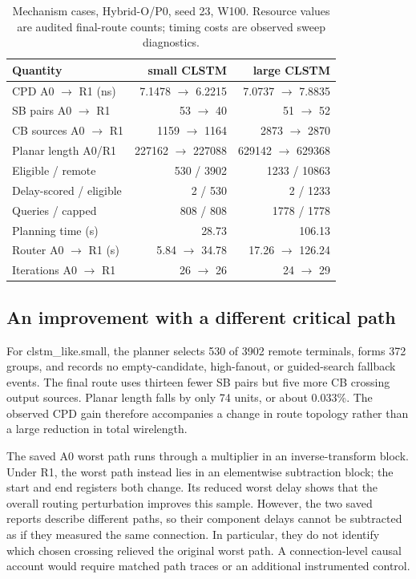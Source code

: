 \documentclass[conference,10pt]{IEEEtran}
\begin{document}
\begin{table}[h]
\centering\caption{Mechanism cases, Hybrid-O/P0, seed 23, W100. Resource values are audited final-route counts; timing costs are observed sweep diagnostics.}
\label{tab:mechanism}
\small\setlength{\tabcolsep}{3pt}
\begin{tabular}{lrr}\hline
Quantity&small CLSTM&large CLSTM\\\hline
CPD A0 $\rightarrow$ R1 (ns)&7.1478 $\to$ 6.2215&7.0737 $\to$ 7.8835\\
SB pairs A0 $\rightarrow$ R1&53 $\rightarrow$ 40&51 $\rightarrow$ 52\\
CB sources A0 $\rightarrow$ R1&1159 $\rightarrow$ 1164&2873 $\rightarrow$ 2870\\
Planar length A0/R1&227162 $\rightarrow$ 227088&629142 $\rightarrow$ 629368\\
Eligible / remote&530 / 3902&1233 / 10863\\
Delay-scored / eligible&2 / 530&2 / 1233\\
Queries / capped&808 / 808&1778 / 1778\\
Planning time (s)&28.73&106.13\\
Router A0 $\rightarrow$ R1 (s)&5.84 $\rightarrow$ 34.78&17.26 $\rightarrow$ 126.24\\
Iterations A0 $\rightarrow$ R1&26 $\rightarrow$ 26&24 $\rightarrow$ 29\\\hline
\end{tabular}
\end{table}

\subsection{An improvement with a different critical path}
For clstm\_like.small, the planner selects 530 of 3902 remote terminals, forms 372 groups, and records no empty-candidate, high-fanout, or guided-search fallback events. The final route uses thirteen fewer SB pairs but five more CB crossing output sources. Planar length falls by only 74 units, or about 0.033\%. The observed CPD gain therefore accompanies a change in route topology rather than a large reduction in total wirelength.

The saved A0 worst path runs through a multiplier in an inverse-transform block. Under R1, the worst path instead lies in an elementwise subtraction block; the start and end registers both change. Its reduced worst delay shows that the overall routing perturbation improves this sample. However, the two saved reports describe different paths, so their component delays cannot be subtracted as if they measured the same connection. In particular, they do not identify which chosen crossing relieved the original worst path. A connection-level causal account would require matched path traces or an additional instrumented control.
\end{document}
